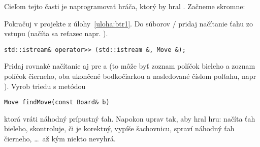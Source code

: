     \def\ttt(#1)#2{
      \begin{scope}[shift={(#1)}]\begin{scope}[scale=\tttscale]\begin{scope}[shift={(-1.5,-1.5)}] 
      \tttgrid{#2}
      \end{scope}\end{scope}\end{scope}
    }
    \def\prt#1#2#3#4{
    \foreach\x in {0,...,#4} {
      \pgfmathsetmacro{\tmp}{\x/#4}
      \coordinate (ptmp) at ($(p#2)!\tmp!(p#3)$);
      \draw[teal,dotted] (p#1)--(ptmp) ;
      \draw[teal] (p#1) -- ($(p#1)!0.6!(ptmp)$);
    }
    }
    
    \def\vals<#1>#2#3{
    \foreach \p/\v in {#2} {
      \node[value,black] at ($(p\p)+(0.015,-0.015)$) {\v};
      \node[value,#3] at (p\p) {\v};
    }
   }



Cieľom tejto časti je naprogramovať hráča, ktorý by hral \btr. 
Začneme skromne:



\begin{uloha}
  \label{uloha:randomplayer}
  Pokračuj v projekte z úlohy~\ref{uloha:btr1}. Do súborov / pridaj
  načítanie ťahu zo vstupu (načíta sa reťazec napr. ). 

\begin{lstlisting}
std::istream& operator>> (std::istream &, Move &);
\end{lstlisting}

  Pridaj rovnaké načítanie aj pre  a  (to môže byť zoznam políčok bieleho
  a zoznam políčok čierneho, oba ukončené bodkočiarkou a nasledované číslom
  polťahu, napr ).
  Vyrob triedu  s metódou 

\begin{lstlisting}
Move findMove(const Board& b)
\end{lstlisting}

  ktorá vráti náhodný prípustný ťah.
  Napokon uprav  tak, aby hral hru: načíta ťah bieleho, skontroluje, či je korektný,
  vypíše šachovnicu, spraví náhodný ťah čierneho, \ldots\ až kým niekto nevyhrá.
\end{uloha}


